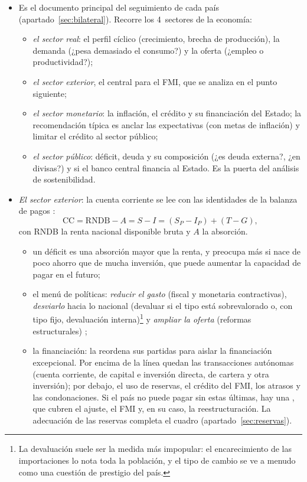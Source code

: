 \documentclass[11pt]{article}
\begin{document}
\begin{itemize}
\item Es el documento principal del seguimiento de cada país (apartado~\ref{sec:bilateral}). Recorre los 4~sectores de la economía:
  \begin{itemize}
  \item \emph{el sector real}: el perfil cíclico (crecimiento, brecha de producción), la demanda (¿pesa demasiado el consumo?) y la oferta (¿empleo o productividad?);
  \item \emph{el sector exterior}, el central para el FMI, que se analiza en el punto siguiente;
  \item \emph{el sector monetario}: la inflación, el crédito y su financiación del Estado; la recomendación típica es anclar las expectativas (con metas de inflación) y limitar el crédito al sector público;
  \item \emph{el sector público}: déficit, deuda y su composición (¿es deuda externa?, ¿en divisas?) y si el banco central financia al Estado. Es la puerta del análisis de sostenibilidad.
  \end{itemize}
\item \emph{El sector exterior}: la cuenta corriente se lee con las identidades de la balanza de pagos :
  \begin{equation}\label{eq:cc-identidades}
  \mathrm{CC}=\mathrm{RNDB}-A=S-I=(S_P-I_P)+(T-G) ,
  \end{equation}
  con RNDB la renta nacional disponible bruta y $A$ la absorción.
  \begin{itemize}
  \item un déficit es una absorción mayor que la renta, y preocupa más si nace de poco ahorro que de mucha inversión, que puede aumentar la capacidad de pagar en el futuro;
  \item el menú de políticas: \emph{reducir el gasto} (fiscal y monetaria contractivas), \emph{desviarlo} hacia lo nacional (devaluar si el tipo está sobrevalorado o, con tipo fijo, devaluación interna)\footnote{La devaluación suele ser la medida más impopular: el encarecimiento de las importaciones lo nota toda la población, y el tipo de cambio se ve a menudo como una cuestión de prestigio del país.} y \emph{ampliar la oferta} (reformas estructurales) ;
  \item la financiación: la  reordena sus partidas para aislar la financiación excepcional. Por encima de la línea quedan las transacciones autónomas (cuenta corriente, de capital e inversión directa, de cartera y otra inversión); por debajo, el uso de reservas, el crédito del FMI, los atrasos y las condonaciones. Si el país no puede pagar sin estas últimas, hay una , que cubren el ajuste, el FMI y, en su caso, la reestructuración. La adecuación de las reservas completa el cuadro (apartado~\ref{sec:reservas}).
  \end{itemize}
\end{itemize}
\end{document}
